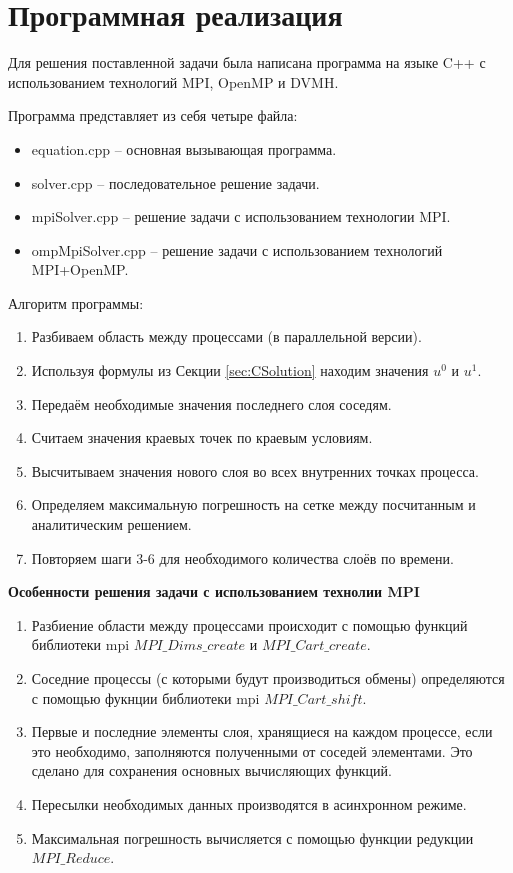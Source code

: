 \section{Программная реализация}
\label{sec:Program} 

Для решения поставленной задачи была написана программа на языке C++ с использованием технологий MPI, OpenMP и DVMH.

Программа представляет из себя четыре файла:
\begin{itemize}
    \item equation.cpp -- основная вызывающая программа.
    \item solver.cpp -- последовательное решение задачи.
    \item mpiSolver.cpp -- решение задачи с использованием технологии MPI.
    \item ompMpiSolver.cpp -- решение задачи с использованием технологий MPI+OpenMP.
\end{itemize}

Алгоритм программы:
\begin{enumerate}
    \item Разбиваем область между процессами (в параллельной версии).
    \item Используя формулы из Секции \ref{sec:CSolution} находим значения $u^0$ и $u^1$.
    \item Передаём необходимые значения последнего слоя соседям.
    \item Считаем значения краевых точек по краевым условиям.
    \item Высчитываем значения нового слоя во всех внутренних точках процесса.
    \item Определяем максимальную погрешность на сетке между посчитанным и аналитическим решением.
    \item Повторяем шаги 3-6 для необходимого количества слоёв по времени.
\end{enumerate}

\textbf{Особенности решения задачи с использованием технолии MPI}

\begin{enumerate}
    \item Разбиение области между процессами происходит с помощью функций библиотеки mpi $MPI\_Dims\_create$ и $MPI\_Cart\_create$.
    \item Соседние процессы (с которыми будут производиться обмены) определяются с помощью фукнции библиотеки mpi $MPI\_Cart\_shift$.
    \item Первые и последние элементы слоя, хранящиеся на каждом процессе, если это необходимо, заполняются полученными от соседей элементами.
            Это сделано для сохранения основных вычисляющих функций.
    \item Пересылки необходимых данных производятся в асинхронном режиме.
    \item Максимальная погрешность вычисляется с помощью функции редукции $MPI\_Reduce$.
\end{enumerate}


